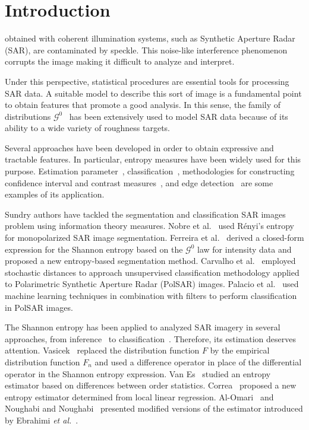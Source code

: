 \documentclass[journal]{IEEEtran}
\begin{document}
\IEEEpeerreviewmaketitle

\section{Introduction}
\label{intro}
 obtained with coherent illumination systems, such as Synthetic Aperture Radar (SAR), are contaminated by speckle. 
This noise-like interference phenomenon corrupts the image making it difficult to analyze and interpret. 

Under this perspective, statistical procedures are essential tools for processing SAR data. 
A suitable model to describe this sort of image is a fundamental point to obtain features that promote a good analysis. 
In this sense, the family of distributions $\mathcal{G}^0$~\cite{Frery97} has been extensively used to model SAR data because of its ability to a wide variety of roughness targets. 

Several approaches have been developed in order to obtain expressive and tractable features. 
In particular, entropy measures have been widely used for this purpose. 
Estimation parameter~\cite{gambini2015}, classification~\cite{Carvalho2019}, methodologies for constructing
confidence interval and contrast measures~\cite{Frery2012,Nascimento2009}, and edge detection~\cite{Nascimento2014} are some examples of its application.

Sundry authors have tackled the segmentation and classification SAR images problem using information theory measures. 
Nobre et al.~\cite{Nobre2016} used Rényi's entropy for monopolarized SAR image segmentation.
Ferreira et al.~\cite{Ferreira2020} derived a closed-form expression for the Shannon entropy based on the $\mathcal{G}^0$ law for intensity data and proposed a new entropy-based segmentation method. 
Carvalho et al.~\cite{Carvalho2019} employed stochastic distances to approach unsupervised classification methodology applied to Polarimetric Synthetic Aperture Radar (PolSAR) images. Palacio et al.~\cite{Palacio2019} used machine learning techniques in combination with filters to perform classification in PolSAR images.

The Shannon entropy has been applied to analyzed SAR imagery in several approaches, from inference~\cite{Frery2012} to classification~\cite{Ferreira2020}. 
Therefore, its estimation deserves attention. 
Vasicek~\cite{Vasicek76} replaced the distribution function $F$ by the empirical distribution function $F_n$ and used a difference operator in place of the differential operator in the Shannon entropy expression. 
Van Es~\cite{VanEs92} studied an entropy estimator based on differences between order statistics. 
Correa~\cite{Correa95} proposed a new entropy estimator determined from local linear regression.
Al-Omari~\cite{AlOmari2016} and Noughabi and Noughabi~\cite{Noughabi13} presented modified versions of the estimator introduced by Ebrahimi \emph{et al.}~\cite{Ebrahimi94}.
\end{document}
